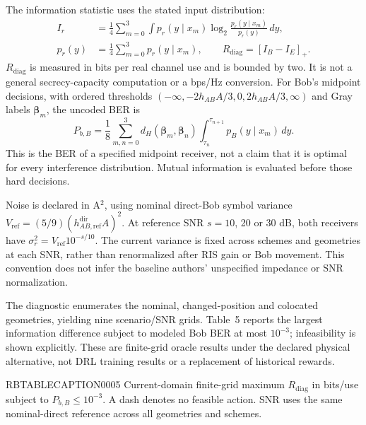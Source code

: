 \documentclass[journal,10pt,twocolumn]{IEEEtran}
\begin{document}
The information statistic uses the stated input distribution:
\begin{equation}
\begin{aligned}
I_r&=\frac14\sum_{m=0}^{3}\int p_r(y\mid x_m)
\log_2\frac{p_r(y\mid x_m)}{p_r(y)}\,dy,\\
p_r(y)&=\frac14\sum_{m=0}^{3}p_r(y\mid x_m),\qquad
R_{\mathrm{diag}}=[I_B-I_E]_+ .
\end{aligned}

\end{equation}
$R_{\mathrm{diag}}$ is measured in bits per real channel use and is bounded by two. It is not a general secrecy-capacity computation or a bps/Hz conversion. For Bob's midpoint decisions, with ordered thresholds $(-\infty,-2h_{AB}A/3,0,2h_{AB}A/3,\infty)$ and Gray labels $\boldsymbol{\beta}_m$, the uncoded BER is
\begin{equation}
P_{b,B}=\frac18\sum_{m,n=0}^{3}
d_H(\boldsymbol{\beta}_m,\boldsymbol{\beta}_n)
\int_{\tau_n}^{\tau_{n+1}}p_B(y\mid x_m)\,dy.

\end{equation}
This is the BER of a specified midpoint receiver, not a claim that it is optimal for every interference distribution. Mutual information is evaluated before those hard decisions.

Noise is declared in A$^2$, using nominal direct-Bob symbol variance $V_{\mathrm{ref}}=(5/9)(h_{AB,\mathrm{ref}}^{\mathrm{dir}}A)^2$. At reference SNR $s=10$, 20 or 30 dB, both receivers have $\sigma_r^2=V_{\mathrm{ref}}10^{-s/10}$. The current variance is fixed across schemes and geometries at each SNR, rather than renormalized after RIS gain or Bob movement. This convention does not infer the baseline authors' unspecified impedance or SNR normalization.

The diagnostic enumerates the nominal, changed-position and colocated geometries, yielding nine scenario/SNR grids. Table~5 reports the largest information difference subject to modeled Bob BER at most $10^{-3}$; infeasibility is shown explicitly. These are finite-grid oracle results under the declared physical alternative, not DRL training results or a replacement of historical rewards.


RBTABLECAPTION0005 Current-domain finite-grid maximum $R_{\mathrm{diag}}$ in bits/use subject to $P_{b,B}\leq10^{-3}$. A dash denotes no feasible action. SNR uses the same nominal-direct reference across all geometries and schemes.
\end{document}

